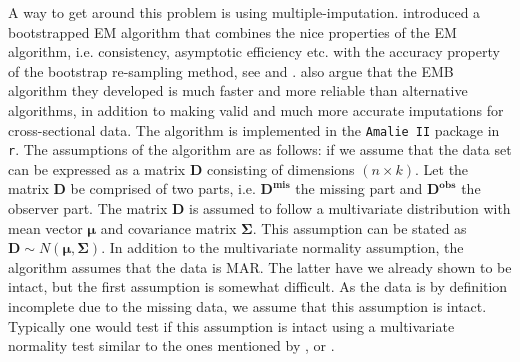 \documentclass[../thesis.tex]{subfiles}
\begin{document}
\indent A way to get around this problem is using multiple-imputation. \cite{honaker2011amelia}  introduced a bootstrapped EM algorithm that combines the nice properties of the EM algorithm, i.e. consistency, asymptotic efficiency etc. with the accuracy property of the bootstrap re-sampling method, see \cite{efron1992bootstrap} and \cite{james2013introduction}. \cite{honaker2011amelia} also argue that the EMB algorithm they developed is much faster and more reliable than alternative algorithms, in addition to making valid and much more accurate imputations for cross-sectional data. The algorithm is implemented in the \texttt{Amalie II} package in \texttt{r}. The assumptions of the algorithm are as follows: if we assume that the data set can be expressed as a matrix $\boldsymbol{D}$ consisting of dimensions $(n\times k)$. Let the matrix $\boldsymbol{D}$ be comprised of two parts, i.e. $\boldsymbol{D^{mis}}$ the missing part and $\boldsymbol{D^{obs}}$ the observer part. The matrix $\boldsymbol{D}$ is assumed to follow a multivariate distribution with mean vector $\boldsymbol{\mu}$ and covariance matrix $\boldsymbol{\Sigma}$. This assumption can be stated as $\boldsymbol{D} \sim N\left(\boldsymbol{\mu},  \boldsymbol{\Sigma}\right)$. In addition to the multivariate normality assumption, the algorithm assumes that the data is MAR. The latter have we already shown to be intact, but the first assumption is somewhat difficult. As the data is by definition incomplete due to the missing data, we assume that this assumption is intact. Typically one would test if this assumption is intact using a multivariate normality test similar to the ones mentioned by \cite{mardia1970measures}, \cite{henze1990class} or \cite{royston1982extension}.


\end{document}

